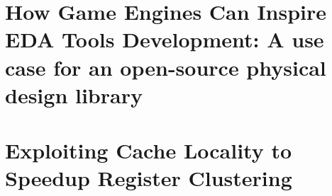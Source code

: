 \documentclass{ufscThesis}
\begin{document}
\capa
\folhaderosto%
% 
% 

\paginaresumo
\paginaabstract
\listadefiguras
\listadetabelas
\begin{singlespacing}

\end{singlespacing}
\listadesimbolos
\sumario















% 
% 
% 
% 
% 
% 
% 
% 




\apendice


\chapter[Artigo ISPD 2017]{How Game Engines Can Inspire EDA Tools Development: A use case for an open-source physical design library}
\label{ap:artigo_ISPD}


\chapter[Artigo SBCCI 2017]{Exploiting Cache Locality to Speedup Register Clustering}
\label{ap:artigo_SBCCI}





\label{ap:producoes}
\end{document}
